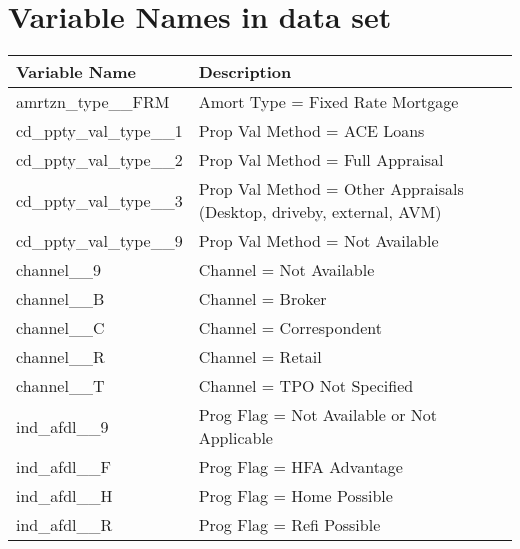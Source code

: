 \appendix

\captionsetup[figure]{list=no}

\chapter{Variable Names in data set}
\begin{longtable}{lp{8cm}}\toprule
\textbf{Variable Name}             & \textbf{Description}                                                 \\\midrule
\endfirsthead
%
\endhead
%
amrtzn\_type\_\_FRM                & Amort Type = Fixed Rate Mortgage                                     \\\hline
cd\_ppty\_val\_type\_\_1           & Prop Val Method = ACE Loans                                          \\
cd\_ppty\_val\_type\_\_2           & Prop Val Method = Full Appraisal                                     \\
cd\_ppty\_val\_type\_\_3           & Prop Val Method = Other Appraisals (Desktop, driveby, external, AVM) \\
cd\_ppty\_val\_type\_\_9           & Prop Val Method = Not Available                                      \\\hline
channel\_\_9                       & Channel = Not Available                                              \\
channel\_\_B                       & Channel = Broker                                                     \\
channel\_\_C                       & Channel = Correspondent                                              \\
channel\_\_R                       & Channel = Retail                                                     \\
channel\_\_T                       & Channel = TPO Not Specified                                          \\\hline
ind\_afdl\_\_9                     & Prog Flag = Not Available or Not Applicable                          \\
ind\_afdl\_\_F                     & Prog Flag = HFA Advantage                                            \\
ind\_afdl\_\_H                     & Prog Flag = Home Possible                                            \\
ind\_afdl\_\_R                     & Prog Flag = Refi Possible                                            \\\hline

\end{longtable}

